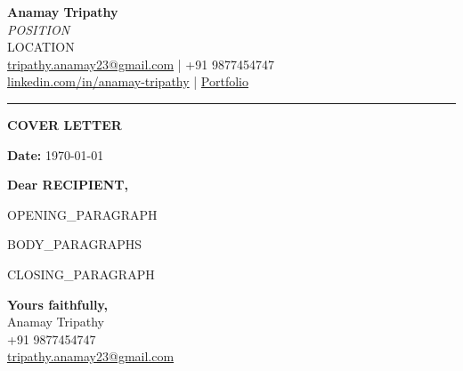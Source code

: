 \documentclass[11pt,a4]{article}
\begin{document}
\begin{center}
    \textbf{\Large Anamay Tripathy} \\[4pt]
    \textit{{{POSITION}}} \\
    {{LOCATION}} \\[4pt]
    \href{mailto:tripathy.anamay23@gmail.com}{tripathy.anamay23@gmail.com}
    \quad | \quad +91 9877454747 \\
    \href{https://www.linkedin.com/in/anamay-tripathy-b53829296/}{linkedin.com/in/anamay-tripathy}
    \quad | \quad \href{https://anamay.vercel.app/}{Portfolio}
\end{center}

\vspace{0.2cm}
\hrule
\vspace{0.4cm}

\begin{center}
    {\LARGE \textbf{COVER LETTER}}
\end{center}

\vspace{0.2cm}
\textbf{Date:} \today

\vspace{0.3cm}
\textbf{Dear {{RECIPIENT}},}

\justify

{{OPENING_PARAGRAPH}}

{{BODY_PARAGRAPHS}}

{{CLOSING_PARAGRAPH}}

\vspace{0.5cm}
\textbf{Yours faithfully,} \\[6pt]
Anamay Tripathy \\
+91 9877454747 \\
\href{mailto:tripathy.anamay23@gmail.com}{tripathy.anamay23@gmail.com}
\end{document}
